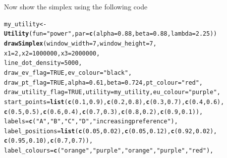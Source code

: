 \documentclass{article}\usepackage[]{graphicx}\usepackage[]{color}
\makeatletter
\newcommand{\hlnum}[1]{\textcolor[rgb]{0.686,0.059,0.569}{#1}}%
\newcommand{\hlstr}[1]{\textcolor[rgb]{0.192,0.494,0.8}{#1}}%
\newcommand{\hlstd}[1]{\textcolor[rgb]{0.345,0.345,0.345}{#1}}%
\newcommand{\hlkwb}[1]{\textcolor[rgb]{0.69,0.353,0.396}{#1}}%
\newcommand{\hlkwc}[1]{\textcolor[rgb]{0.333,0.667,0.333}{#1}}%
\newcommand{\hlkwd}[1]{\textcolor[rgb]{0.737,0.353,0.396}{\textbf{#1}}}%
\newenvironment{kframe}{%
 \def\at@end@of@kframe{}%
 \ifinner\ifhmode%
  \def\at@end@of@kframe{\end{minipage}}%
  \begin{minipage}{\columnwidth}%
 \fi\fi%
 \def\FrameCommand##1{\hskip\@totalleftmargin \hskip-\fboxsep
 \colorbox{shadecolor}{##1}\hskip-\fboxsep
     \hskip-\linewidth \hskip-\@totalleftmargin \hskip\columnwidth}%
 \MakeFramed {\advance\hsize-\width
   \@totalleftmargin\z@ \linewidth\hsize
   \@setminipage}}%
 {\par\unskip\endMakeFramed%
 \at@end@of@kframe}
\newenvironment{knitrout}{}{} %
\makeatother
\begin{document}
Now show the simplex using the following code

\begin{knitrout}
\color{fgcolor}\begin{kframe}
\begin{alltt}
\hlstd{my_utility} \hlkwb{<-} \hlkwd{Utility}\hlstd{(}\hlkwc{fun}\hlstd{=}\hlstr{"power"}\hlstd{,} \hlkwc{par}\hlstd{=}\hlkwd{c}\hlstd{(}\hlkwc{alpha}\hlstd{=}\hlnum{0.88}\hlstd{,} \hlkwc{beta}\hlstd{=}\hlnum{0.88}\hlstd{,} \hlkwc{lambda}\hlstd{=}\hlnum{2.25}\hlstd{))}
\hlkwd{drawSimplex}\hlstd{(}\hlkwc{window_width}\hlstd{=}\hlnum{7}\hlstd{,} \hlkwc{window_height}\hlstd{=}\hlnum{7}\hlstd{,}
        \hlkwc{x1}\hlstd{=}\hlnum{2}\hlstd{,} \hlkwc{x2}\hlstd{=}\hlnum{1000000}\hlstd{,} \hlkwc{x3}\hlstd{=}\hlnum{2000000}\hlstd{,}
        \hlkwc{line_dot_density}\hlstd{=}\hlnum{5000}\hlstd{,}
        \hlkwc{draw_ev_flag}\hlstd{=}\hlnum{TRUE}\hlstd{,} \hlkwc{ev_colour}\hlstd{=}\hlstr{"black"}\hlstd{,}
        \hlkwc{draw_pt_flag}\hlstd{=}\hlnum{TRUE}\hlstd{,} \hlkwc{alpha}\hlstd{=}\hlnum{0.61}\hlstd{,} \hlkwc{beta}\hlstd{=}\hlnum{0.724}\hlstd{,} \hlkwc{pt_colour}\hlstd{=}\hlstr{"red"}\hlstd{,}
        \hlkwc{draw_utility_flag}\hlstd{=}\hlnum{TRUE}\hlstd{,} \hlkwc{utility}\hlstd{=my_utility,} \hlkwc{eu_colour}\hlstd{=}\hlstr{"purple"}\hlstd{,}
        \hlkwc{start_points}\hlstd{=}\hlkwd{list}\hlstd{(}\hlkwd{c}\hlstd{(}\hlnum{0.1}\hlstd{,}\hlnum{0.9}\hlstd{),}\hlkwd{c}\hlstd{(}\hlnum{0.2}\hlstd{,}\hlnum{0.8}\hlstd{),}\hlkwd{c}\hlstd{(}\hlnum{0.3}\hlstd{,}\hlnum{0.7}\hlstd{),}\hlkwd{c}\hlstd{(}\hlnum{0.4}\hlstd{,}\hlnum{0.6}\hlstd{),}
                \hlkwd{c}\hlstd{(}\hlnum{0.5}\hlstd{,}\hlnum{0.5}\hlstd{),}\hlkwd{c}\hlstd{(}\hlnum{0.6}\hlstd{,}\hlnum{0.4}\hlstd{),}\hlkwd{c}\hlstd{(}\hlnum{0.7}\hlstd{,}\hlnum{0.3}\hlstd{),}\hlkwd{c}\hlstd{(}\hlnum{0.8}\hlstd{,}\hlnum{0.2}\hlstd{),}\hlkwd{c}\hlstd{(}\hlnum{0.9}\hlstd{,}\hlnum{0.1}\hlstd{)),}
        \hlkwc{labels}\hlstd{=}\hlkwd{c}\hlstd{(}\hlstr{"A"}\hlstd{,}\hlstr{"B"}\hlstd{,}\hlstr{"C"}\hlstd{,}\hlstr{"D"}\hlstd{,}\hlstr{"increasing preference"}\hlstd{),}
        \hlkwc{label_positions}\hlstd{=}\hlkwd{list}\hlstd{(}\hlkwd{c}\hlstd{(}\hlnum{0.05}\hlstd{,}\hlnum{0.02}\hlstd{),}\hlkwd{c}\hlstd{(}\hlnum{0.05}\hlstd{,}\hlnum{0.12}\hlstd{),}\hlkwd{c}\hlstd{(}\hlnum{0.92}\hlstd{,}\hlnum{0.02}\hlstd{),}
                \hlkwd{c}\hlstd{(}\hlnum{0.95}\hlstd{,}\hlnum{0.10}\hlstd{),}\hlkwd{c}\hlstd{(}\hlnum{0.7}\hlstd{,}\hlnum{0.7}\hlstd{)),}
        \hlkwc{label_colours}\hlstd{=}\hlkwd{c}\hlstd{(}\hlstr{"orange"}\hlstd{,}\hlstr{"purple"}\hlstd{,}\hlstr{"orange"}\hlstd{,}\hlstr{"purple"}\hlstd{,}\hlstr{"red"}\hlstd{),}

\end{alltt}
\end{kframe}
\end{knitrout}
\end{document}
